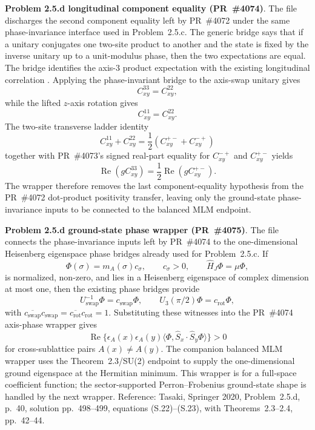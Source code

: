 \documentclass[a4paper,11pt]{article}
\begin{document}
\textbf{Problem 2.5.d longitudinal component equality (PR~\#4074)}.
The file 
discharges the second component equality left by PR~\#4072 under the same
phase-invariance interface used in Problem~2.5.c.  The generic bridge
 says that if a
unitary conjugates one two-site product to another and the state is fixed by
the inverse unitary up to a unit-modulus phase, then the two expectations are
equal.  The bridge
 identifies
the axis-3 product expectation with the existing longitudinal correlation
.  Applying the phase-invariant bridge to the
axis-swap unitary gives
\[
  C^{33}_{xy}=C^{22}_{xy},
\]
while the lifted \(z\)-axis rotation gives
\[
  C^{11}_{xy}=C^{22}_{xy}.
\]
The two-site transverse ladder identity
\[
  C^{11}_{xy}+C^{22}_{xy}
  =\frac12(C^{+-}_{xy}+C^{-+}_{xy})
\]
together with PR~\#4073's signed real-part equality for
\(C^{-+}_{xy}\) and \(C^{+-}_{xy}\) yields
\[
  \operatorname{Re}(gC^{33}_{xy})
  =\frac12\operatorname{Re}(gC^{+-}_{xy}).
\]
The wrapper
therefore removes the last component-equality hypothesis from the PR~\#4072
dot-product positivity transfer, leaving only the ground-state phase-invariance
inputs to be connected to the balanced MLM endpoint.

\textbf{Problem 2.5.d ground-state phase wrapper (PR~\#4075)}.
The file 
connects the phase-invariance inputs left by PR~\#4074 to the
one-dimensional Heisenberg eigenspace phase bridges already used for
Problem~2.5.c.  If
\[
  \Phi(\sigma)=m_A(\sigma)c_\sigma,\qquad c_\sigma>0,
  \qquad \hat H_J\Phi=\mu\Phi,
\]
is normalized, non-zero, and lies in a Heisenberg eigenspace of complex
dimension at most one, then the existing phase bridges provide
\[
  U_{\mathrm{swap}}^{-1}\Phi=c_{\mathrm{swap}}\Phi,\qquad
  U_3(\pi/2)\Phi=c_{\mathrm{rot}}\Phi,
\]
with \(\overline{c_{\mathrm{swap}}}c_{\mathrm{swap}}=
\overline{c_{\mathrm{rot}}}c_{\mathrm{rot}}=1\).  Substituting these witnesses
into the PR~\#4074 axis-phase wrapper gives
\[
  \operatorname{Re}\{\epsilon_A(x)\epsilon_A(y)
    \langle\Phi,\hat S_x\cdot\hat S_y\Phi\rangle\}>0
\]
for cross-sublattice pairs \(A(x)\ne A(y)\).  The companion balanced MLM
wrapper uses the Theorem~2.3/SU(2) endpoint to supply the one-dimensional
ground eigenspace at the Hermitian minimum.  This wrapper is for a full-space
coefficient function; the sector-supported Perron--Frobenius ground-state
shape is handled by the next wrapper.  Reference: Tasaki, Springer 2020,
Problem~2.5.d, p.~40, solution pp.~498--499, equations (S.22)--(S.23), with
Theorems~2.3--2.4, pp.~42--44.
\end{document}
